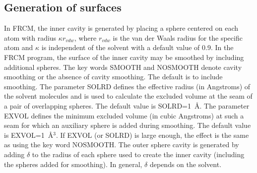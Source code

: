 \documentclass[oneside,11pt,openany]{book}
\begin{document}
\subsection*{Generation of surfaces}
%
In FRCM, the inner cavity is generated by placing
a sphere centered on each atom with radius $\kappa r_{vdw}$,
where $r_{vdw}$ is the van der Waals radius for the specific atom
and $\kappa$ is independent of the solvent
with a default value of 0.9.
In the FRCM program, the surface of the inner cavity
may be smoothed by including additional spheres.
The key words SMOOTH and NOSMOOTH denote cavity smoothing
or the absence of cavity smoothing.  The default is to include
smoothing.  
The parameter SOLRD defines the effective radius (in Angstroms) of the solvent
molecules and is used to calculate the excluded volume at the
seam of a pair of overlapping spheres.
The default value is SOLRD=1~\AA.
The parameter EXVOL defines
the minimum excluded volume (in cubic Angstroms) at such a seam
for which an auxiliary sphere is
added during smoothing.  The default value is EXVOL=1~\AA$^{3}$.
If EXVOL (or SOLRD) is large enough, the effect is the same as
using the key word NOSMOOTH.
The outer sphere cavity is generated by adding
$\delta$ to the radius of each sphere used to create
the inner cavity (including the spheres added for smoothing).
In general, $\delta$ depends on the solvent.
%
\end{document}
